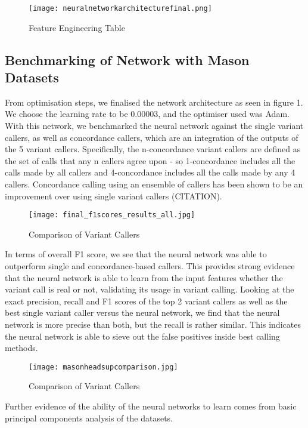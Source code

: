 \documentclass{article}
\begin{document}
\begin{figure}[H]
\caption{Feature Engineering Table}
\texttt{[image: neuralnetworkarchitecturefinal.png]}
\centering
\end{figure}



\subsection{Benchmarking of Network with Mason Datasets}
From optimisation steps, we finalised the network architecture as seen in figure 1. We choose the learning rate to be 0.00003, and the optimiser used was Adam. With this network, we benchmarked the neural network against the single variant callers, as well as concordance callers, which are an integration of the outputs of the 5 variant callers. Specifically, the n-concordance variant callers are defined as the set of calls that any n callers agree upon - so 1-concordance includes all the calls made by all callers and 4-concordance includes all the calls made by any 4 callers. Concordance calling using an ensemble of callers has been shown to be an improvement over using single variant callers (CITATION). 

\begin{figure}[H]
\texttt{[image: final\_f1scores\_results\_all.jpg]}
\caption{Comparison of Variant Callers}
\centering
\end{figure}

In terms of overall F1 score, we see that the neural network was able to outperform single and concordance-based callers. This provides strong evidence that the neural network is able to learn from the input features whether the variant call is real or not, validating its usage in variant calling. Looking at the exact precision, recall and F1 scores of the top 2 variant callers as well as the best single variant caller versus the neural network, we find that the neural network is more precise than both, but the recall is rather similar. This indicates the neural network is able to sieve out the false positives inside best calling methods. 

\begin{figure}[H]
\texttt{[image: masonheadsupcomparison.jpg]}
\caption{Comparison of Variant Callers}
\centering
\end{figure}

Further evidence of the ability of the neural networks to learn comes from basic principal components analysis of the datasets. 
\end{document}

